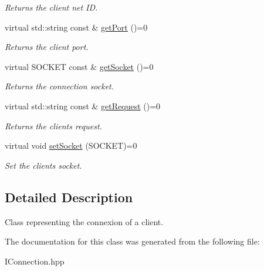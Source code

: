 \begin{DoxyCompactItemize}
\begin{DoxyCompactList}\small\item\em Returns the client net I\+D. \end{DoxyCompactList}\item 
\hypertarget{class_i_connection_a7e1faa59d9ae7c6bc53bb491e5afd7e2}{}virtual std\+::string const \& \hyperlink{class_i_connection_a7e1faa59d9ae7c6bc53bb491e5afd7e2}{get\+Port} ()=0\label{class_i_connection_a7e1faa59d9ae7c6bc53bb491e5afd7e2}

\begin{DoxyCompactList}\small\item\em Returns the client port. \end{DoxyCompactList}\item 
\hypertarget{class_i_connection_a09349b5ba8ce8e381cf34ab12ba40c9c}{}virtual S\+O\+C\+K\+E\+T const \& \hyperlink{class_i_connection_a09349b5ba8ce8e381cf34ab12ba40c9c}{get\+Socket} ()=0\label{class_i_connection_a09349b5ba8ce8e381cf34ab12ba40c9c}

\begin{DoxyCompactList}\small\item\em Returns the connection socket. \end{DoxyCompactList}\item 
\hypertarget{class_i_connection_a78d5be69e5e26c7645b04a1903b1557d}{}virtual std\+::string const \& \hyperlink{class_i_connection_a78d5be69e5e26c7645b04a1903b1557d}{get\+Request} ()=0\label{class_i_connection_a78d5be69e5e26c7645b04a1903b1557d}

\begin{DoxyCompactList}\small\item\em Returns the client\textquotesingle{}s request. \end{DoxyCompactList}\item 
\hypertarget{class_i_connection_a7efb00e9c99e0eac30f5005aca9ed571}{}virtual void \hyperlink{class_i_connection_a7efb00e9c99e0eac30f5005aca9ed571}{set\+Socket} (S\+O\+C\+K\+E\+T)=0\label{class_i_connection_a7efb00e9c99e0eac30f5005aca9ed571}

\begin{DoxyCompactList}\small\item\em Set the client\textquotesingle{}s socket. \end{DoxyCompactList}\end{DoxyCompactItemize}


\subsection{Detailed Description}
Class representing the connexion of a client. 

The documentation for this class was generated from the following file\+:\begin{DoxyCompactItemize}
\item 
I\+Connection.\+hpp\end{DoxyCompactItemize}
